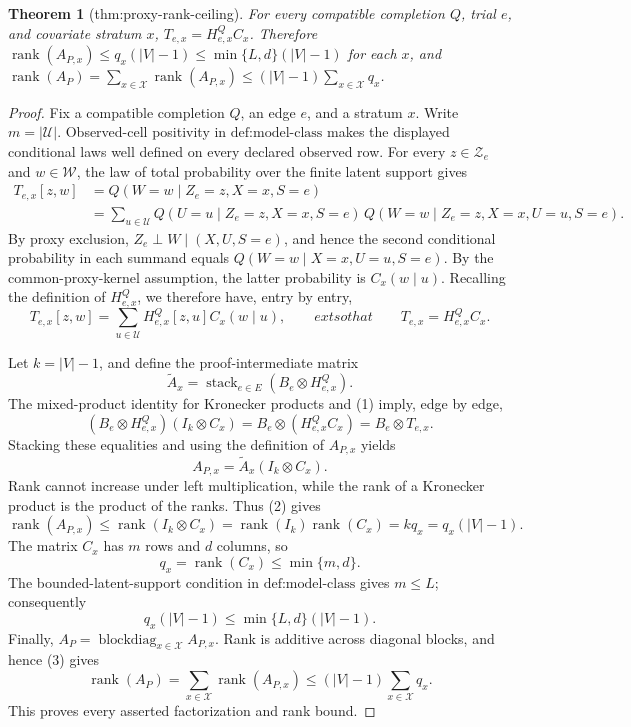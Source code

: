 \documentclass{article}
\newtheorem{theorem}{Theorem}
\begin{document}
\begin{theorem}[thm:proxy-rank-ceiling]\label{thm:proxy-rank-ceiling}
For every compatible completion \(Q\), trial \(e\), and covariate stratum \(x\), \(T_{e,x}=H^Q_{e,x}C_x\). Therefore \(\operatorname{rank}(A_{P,x})\le q_x(|V|-1)\le\min\{L,d\}(|V|-1)\) for each \(x\), and \(\operatorname{rank}(A_P)=\sum_{x\in\mathcal X}\operatorname{rank}(A_{P,x})\le(|V|-1)\sum_{x\in\mathcal X}q_x\).
\end{theorem}
\begin{proof}
Fix a compatible completion \(Q\), an edge \(e\), and a stratum \(x\).  Write \(m=|\mathcal U|\).  Observed-cell positivity in \(\text{def:model-class}\) makes the displayed conditional laws well defined on every declared observed row.  For every \(z\in\mathcal Z_e\) and \(w\in\mathcal W\), the law of total probability over the finite latent support gives
\[
\begin{aligned}
T_{e,x}[z,w]
&=Q(W=w\mid Z_e=z,X=x,S=e)\\
&=\sum_{u\in\mathcal U}Q(U=u\mid Z_e=z,X=x,S=e)\,
 Q(W=w\mid Z_e=z,X=x,U=u,S=e).
\end{aligned}
\]
By proxy exclusion, \(Z_e\perp W\mid(X,U,S=e)\), and hence the second conditional probability in each summand equals \(Q(W=w\mid X=x,U=u,S=e)\).  By the common-proxy-kernel assumption, the latter probability is \(C_x(w\mid u)\).  Recalling the definition of \(H^Q_{e,x}\), we therefore have, entry by entry,
\[
T_{e,x}[z,w]=\sum_{u\in\mathcal U}H^Q_{e,x}[z,u]C_x(w\mid u),
\qquad  ext{so that}\qquad
T_{e,x}=H^Q_{e,x}C_x.
\tag{1}
\]

Let \(k=|V|-1\), and define the proof-intermediate matrix
\[
\widetilde A_x=\operatorname{stack}_{e\in E}(B_e\otimes H^Q_{e,x}).
\]
The mixed-product identity for Kronecker products and (1) imply, edge by edge,
\[
(B_e\otimes H^Q_{e,x})(I_k\otimes C_x)
=B_e\otimes(H^Q_{e,x}C_x)
=B_e\otimes T_{e,x}.
\]
Stacking these equalities and using the definition of \(A_{P,x}\) yields
\[
A_{P,x}=\widetilde A_x(I_k\otimes C_x).
\tag{2}
\]
Rank cannot increase under left multiplication, while the rank of a Kronecker product is the product of the ranks.  Thus (2) gives
\[
\operatorname{rank}(A_{P,x})
\leq \operatorname{rank}(I_k\otimes C_x)
=\operatorname{rank}(I_k)\operatorname{rank}(C_x)
=kq_x=q_x(|V|-1).
\tag{3}
\]
The matrix \(C_x\) has \(m\) rows and \(d\) columns, so
\[
q_x=\operatorname{rank}(C_x)\leq\min\{m,d\}.
\]
The bounded-latent-support condition in \(\text{def:model-class}\) gives \(m\leq L\); consequently
\[
q_x(|V|-1)\leq\min\{L,d\}(|V|-1).
\tag{4}
\]
Finally, \(A_P=\operatorname{blockdiag}_{x\in\mathcal X}A_{P,x}\).  Rank is additive across diagonal blocks, and hence (3) gives
\[
\operatorname{rank}(A_P)
=\sum_{x\in\mathcal X}\operatorname{rank}(A_{P,x})
\leq (|V|-1)\sum_{x\in\mathcal X}q_x.
\]
This proves every asserted factorization and rank bound.
\end{proof}
\end{document}
